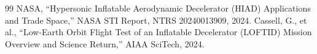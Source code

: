 \documentclass[10pt]{article}
\begin{document}
\begin{sloppypar}
\begin{thebibliography}{99}
 NASA, ``Hypersonic Inflatable Aerodynamic Decelerator (HIAD) Applications and Trade Space,'' NASA STI Report, NTRS 20240013909, 2024.
 Cassell, G., et al., ``Low-Earth Orbit Flight Test of an Inflatable Decelerator (LOFTID) Mission Overview and Science Return,'' AIAA SciTech, 2024.
\end{thebibliography}
\end{sloppypar}
\end{document}
